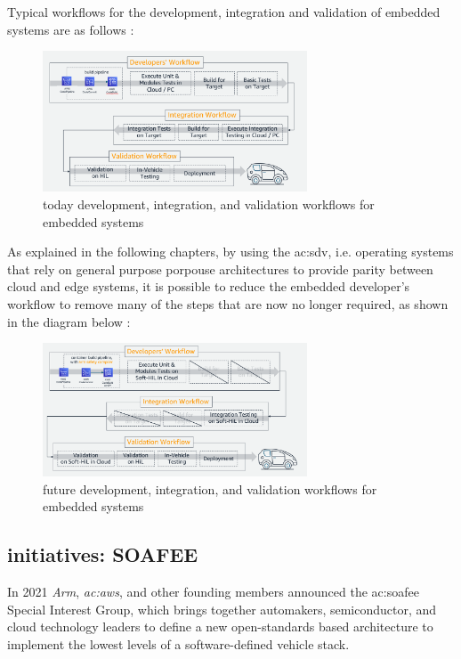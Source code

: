 Typical workflows for the development, integration and validation of embedded systems are as follows \cite{DevelopersWorkflow}:
\begin{figure}[h]  %
    \centering
    \includegraphics[width=0.7\textwidth]{images/today_developer_workflow.png}  %
    \caption{today development, integration, and validation workflows for embedded systems}
    \label{fig:TodayDeveloperWorkflow}
\end{figure}

As explained in the following chapters, by using the \gls{ac:sdv}, i.e. operating systems that rely on general purpose porpouse architectures to provide parity between cloud and edge systems, it is possible to reduce the embedded developer's workflow to remove many of the steps that are now no longer required, as shown in the diagram below \cite{DevelopersWorkflow}:
\begin{figure}[h]  %
    \centering
    \includegraphics[width=0.7\textwidth]{images/future_developers_workflow.png}  %
    \caption{future development, integration, and validation workflows for embedded systems}
    \label{fig:FutureDevelopersWorkflow}
\end{figure}

\subsection{initiatives: SOAFEE}
In 2021 \textit{Arm}, \textit{\gls{ac:aws}}, and other founding members announced the \gls{ac:soafee} Special Interest Group, which brings together automakers, semiconductor, and cloud technology leaders to define a new open-standards based architecture to implement the lowest levels of a software-defined vehicle stack. \cite{DevelopersWorkflow}

